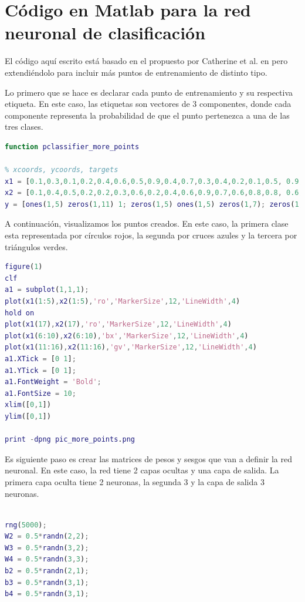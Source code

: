 \documentclass[a4paper,11pt,spanish, twoside, leqno]{tfg-uam}
\theoremstyle{definition}
\begin{document}
\printbibliography
\cleardoublepage

\appendix   
\chapter{Código en Matlab para la red neuronal de clasificación\label{sec:codigo_clasificacion}}

El código aquí escrito está basado en el propuesto por Catherine et al. en \cite{deeplearningSIAM} pero extendiéndolo para incluir más puntos de entrenamiento de distinto tipo.

Lo primero que se hace es declarar cada punto de entrenamiento y su respectiva etiqueta. En este caso, las etiquetas son vectores de 3 componentes, donde cada componente representa la probabilidad de que el punto pertenezca a una de las tres clases. 

\begin{lstlisting}[language=Matlab]
function pclassifier_more_points

% xcoords, ycoords, targets
x1 = [0.1,0.3,0.1,0.2,0.4,0.6,0.5,0.9,0.4,0.7,0.3,0.4,0.2,0.1,0.5, 0.9,0.8];
x2 = [0.1,0.4,0.5,0.2,0.2,0.3,0.6,0.2,0.4,0.6,0.9,0.7,0.6,0.8,0.8, 0.6,0.1];
y = [ones(1,5) zeros(1,11) 1; zeros(1,5) ones(1,5) zeros(1,7); zeros(1,10) ones(1,6) 0];
\end{lstlisting}

A continuación, visualizamos los puntos creados. En este caso, la primera clase esta representada por círculos rojos, la segunda por cruces azules y la tercera por triángulos verdes.

\begin{lstlisting}[language=Matlab]
figure(1)
clf
a1 = subplot(1,1,1);
plot(x1(1:5),x2(1:5),'ro','MarkerSize',12,'LineWidth',4)
hold on
plot(x1(17),x2(17),'ro','MarkerSize',12,'LineWidth',4)
plot(x1(6:10),x2(6:10),'bx','MarkerSize',12,'LineWidth',4)
plot(x1(11:16),x2(11:16),'gv','MarkerSize',12,'LineWidth',4)
a1.XTick = [0 1];
a1.YTick = [0 1];
a1.FontWeight = 'Bold';
a1.FontSize = 10;
xlim([0,1])
ylim([0,1])

print -dpng pic_more_points.png

\end{lstlisting}

Es siguiente paso es crear las matrices de pesos y sesgos que van a definir la red neuronal. En este caso, la red tiene 2 capas ocultas y una capa de salida. La primera capa oculta tiene 2 neuronas, la segunda 3 y la capa de salida 3 neuronas.

\begin{lstlisting}[language=Matlab]

rng(5000);
W2 = 0.5*randn(2,2);
W3 = 0.5*randn(3,2);
W4 = 0.5*randn(3,3);
b2 = 0.5*randn(2,1);
b3 = 0.5*randn(3,1);
b4 = 0.5*randn(3,1);

\end{lstlisting}
\end{document}
